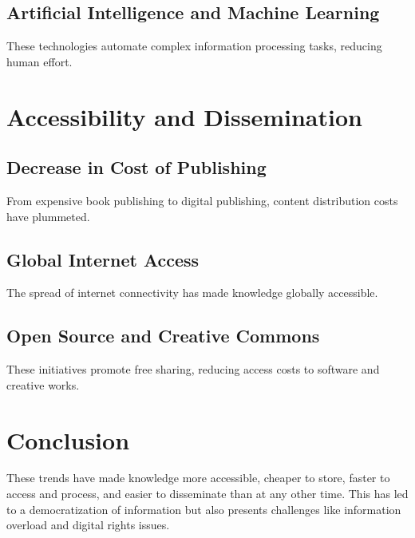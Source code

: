 \documentclass{book}
\begin{document}
\subsection{Artificial Intelligence and Machine Learning}
These technologies automate complex information processing tasks, reducing human effort.

\section{Accessibility and Dissemination}

\subsection{Decrease in Cost of Publishing}
From expensive book publishing to digital publishing, content distribution costs have plummeted.

\subsection{Global Internet Access}
The spread of internet connectivity has made knowledge globally accessible.

\subsection{Open Source and Creative Commons}
These initiatives promote free sharing, reducing access costs to software and creative works.

\section{Conclusion}

These trends have made knowledge more accessible, cheaper to store, faster to access and process, and easier to disseminate than at any other time. This has led to a democratization of information but also presents challenges like information overload and digital rights issues.
\end{document}
